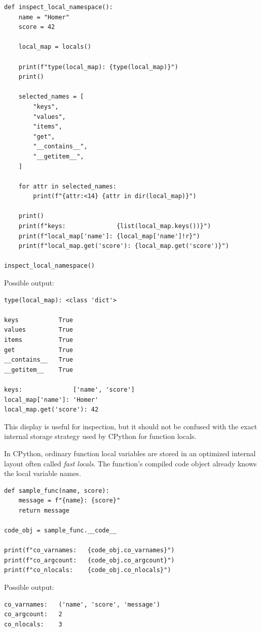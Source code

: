 \begin{verbatim}
def inspect_local_namespace():
    name = "Homer"
    score = 42

    local_map = locals()

    print(f"type(local_map): {type(local_map)}")
    print()

    selected_names = [
        "keys",
        "values",
        "items",
        "get",
        "__contains__",
        "__getitem__",
    ]

    for attr in selected_names:
        print(f"{attr:<14} {attr in dir(local_map)}")

    print()
    print(f"keys:              {list(local_map.keys())}")
    print(f"local_map['name']: {local_map['name']!r}")
    print(f"local_map.get('score'): {local_map.get('score')}")

inspect_local_namespace()
\end{verbatim}

Possible output:

\begin{verbatim}
type(local_map): <class 'dict'>

keys           True
values         True
items          True
get            True
__contains__   True
__getitem__    True

keys:              ['name', 'score']
local_map['name']: 'Homer'
local_map.get('score'): 42
\end{verbatim}

This display is useful for inspection, but it should not be confused with the exact internal storage strategy used by CPython for function locals.

In CPython, ordinary function local variables are stored in an optimized internal layout often called \textit{fast locals}. The function's compiled code object already knows the local variable names.

\begin{verbatim}
def sample_func(name, score):
    message = f"{name}: {score}"
    return message

code_obj = sample_func.__code__

print(f"co_varnames:   {code_obj.co_varnames}")
print(f"co_argcount:   {code_obj.co_argcount}")
print(f"co_nlocals:    {code_obj.co_nlocals}")
\end{verbatim}

Possible output:

\begin{verbatim}
co_varnames:   ('name', 'score', 'message')
co_argcount:   2
co_nlocals:    3
\end{verbatim}

